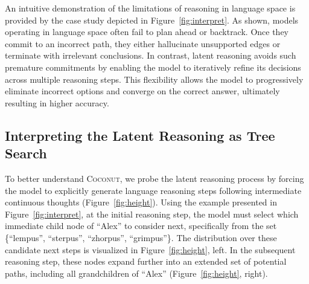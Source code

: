 \documentclass[]{fairmeta}
\newcommand{\ours}{\textsc{Coconut}\xspace}
\begin{document}
An intuitive demonstration of the limitations of reasoning in language space is provided by the case study depicted in Figure~\ref{fig:interpret}. As shown, models operating in language space often fail to plan ahead or backtrack. Once they commit to an incorrect path, they either hallucinate unsupported edges or terminate with irrelevant conclusions. In contrast, latent reasoning avoids such premature commitments by enabling the model to iteratively refine its decisions across multiple reasoning steps. This flexibility allows the model to progressively eliminate incorrect options and converge on the correct answer, ultimately resulting in higher accuracy.





\subsection{Interpreting the Latent Reasoning as Tree Search}
\label{sec:interpret}

To better understand \ours, we probe the latent reasoning process by forcing the model to explicitly generate language reasoning steps following intermediate continuous thoughts (Figure~\ref{fig:height}). Using the example presented in Figure~\ref{fig:interpret}, at the initial reasoning step, the model must select which immediate child node of ``Alex'' to consider next, specifically from the set \{``lempus'', ``sterpus'', ``zhorpus'', ``grimpus''\}. The distribution over these candidate next steps is visualized in Figure~\ref{fig:height}, left. In the subsequent reasoning step, these nodes expand further into an extended set of potential paths, including all grandchildren of ``Alex'' (Figure~\ref{fig:height}, right).
\end{document}

